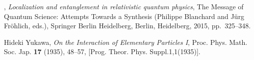 \documentclass[12pt,a4paper]{article}
\newcommand{\1}{\mathds{1}}                         %
\begin{document}
{\begin{thebibliography}{BDFY15}
	\bysame, \emph{Localization and entanglement in relativistic quantum physics},
	The Message of Quantum Science: Attempts Towards a Synthesis (Philippe
	Blanchard and J{\"u}rg Fr{\"o}hlich, eds.), Springer Berlin Heidelberg,
	Berlin, Heidelberg, 2015, pp.~325--348.
	
	Hideki Yukawa, \emph{{On the Interaction of Elementary Particles I}}, Proc.
	Phys. Math. Soc. Jap. \textbf{17} (1935), 48--57, [Prog. Theor. Phys.
	Suppl.1,1(1935)].
	
\end{thebibliography}}
\end{document}
